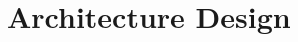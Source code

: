 \documentclass[conference,compsoc]{IEEEtran}
\begin{document}







\section{Architecture Design}\label{sec:architecture}
\end{document}
